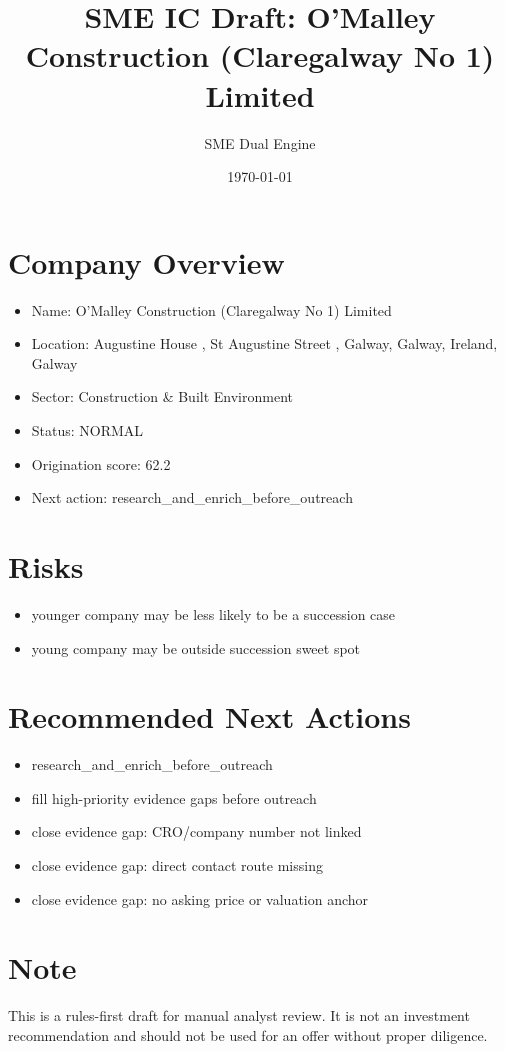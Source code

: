 \documentclass[11pt,a4paper]{article}
\title{SME IC Draft: O'Malley Construction (Claregalway No 1) Limited}
\author{SME Dual Engine}
\date{\today}
\begin{document}
\maketitle
\section*{Company Overview}
\begin{itemize}[leftmargin=1.4em]
\item Name: O'Malley Construction (Claregalway No 1) Limited
\item Location: Augustine House , St Augustine Street , Galway, Galway, Ireland, Galway
\item Sector: Construction \& Built Environment
\item Status: NORMAL
\item Origination score: 62.2
\item Next action: research\_and\_enrich\_before\_outreach
\end{itemize}
\section*{Risks}
\begin{itemize}[leftmargin=1.4em]
\item younger company may be less likely to be a succession case
\item young company may be outside succession sweet spot
\end{itemize}
\section*{Recommended Next Actions}
\begin{itemize}[leftmargin=1.4em]
\item research\_and\_enrich\_before\_outreach
\item fill high-priority evidence gaps before outreach
\item close evidence gap: CRO/company number not linked
\item close evidence gap: direct contact route missing
\item close evidence gap: no asking price or valuation anchor
\end{itemize}
\section*{Note}
This is a rules-first draft for manual analyst review. It is not an investment
recommendation and should not be used for an offer without proper diligence.
\end{document}
